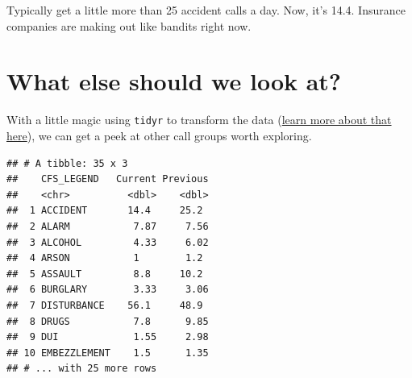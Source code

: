 \documentclass[]{book}
\newenvironment{Shaded}{\begin{snugshade}}{\end{snugshade}}
\newcommand{\DataTypeTok}[1]{\textcolor[rgb]{0.13,0.29,0.53}{#1}}
\newcommand{\DecValTok}[1]{\textcolor[rgb]{0.00,0.00,0.81}{#1}}
\newcommand{\KeywordTok}[1]{\textcolor[rgb]{0.13,0.29,0.53}{\textbf{#1}}}
\newcommand{\NormalTok}[1]{#1}
\newcommand{\OperatorTok}[1]{\textcolor[rgb]{0.81,0.36,0.00}{\textbf{#1}}}
\newcommand{\StringTok}[1]{\textcolor[rgb]{0.31,0.60,0.02}{#1}}
\begin{document}
Typically get a little more than 25 accident calls a day. Now, it's 14.4. Insurance companies are making out like bandits right now.

\hypertarget{what-else-should-we-look-at}{%
\section{What else should we look at?}\label{what-else-should-we-look-at}}

With a little magic using \texttt{tidyr} to transform the data (\href{http://mattwaite.github.io/sports/transforming-data.html}{learn more about that here}), we can get a peek at other call groups worth exploring.

\begin{Shaded}
\end{Shaded}

\begin{verbatim}
## # A tibble: 35 x 3
##    CFS_LEGEND   Current Previous
##    <chr>          <dbl>    <dbl>
##  1 ACCIDENT       14.4     25.2 
##  2 ALARM           7.87     7.56
##  3 ALCOHOL         4.33     6.02
##  4 ARSON           1        1.2 
##  5 ASSAULT         8.8     10.2 
##  6 BURGLARY        3.33     3.06
##  7 DISTURBANCE    56.1     48.9 
##  8 DRUGS           7.8      9.85
##  9 DUI             1.55     2.98
## 10 EMBEZZLEMENT    1.5      1.35
## # ... with 25 more rows
\end{verbatim}
\end{document}
